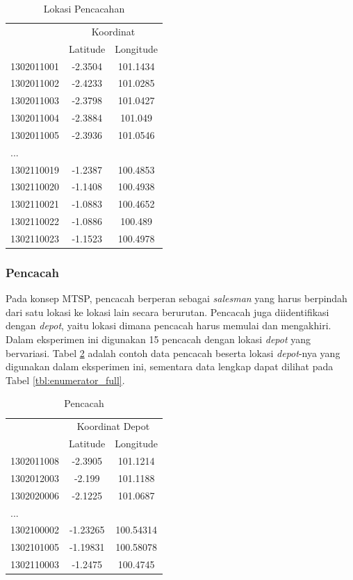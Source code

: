\begin{table}\centering
{}
\caption{Lokasi Pencacahan}
\label{tbl:enumeration_locations}
\begin{tabular}{lcc}
\toprule
& \multicolumn{2}{c}{Koordinat}\\
\cmidrule{2-3}
& Latitude & Longitude\\ 
\midrule
1302011001 & -2.3504 & 101.1434\\ 
1302011002 & -2.4233 & 101.0285\\ 
1302011003 & -2.3798 & 101.0427\\ 
1302011004 & -2.3884 & 101.049\\ 
1302011005 & -2.3936 & 101.0546\\
...\\
1302110019 & -1.2387 & 100.4853\\ 
1302110020 & -1.1408 & 100.4938\\ 
1302110021 & -1.0883 & 100.4652\\ 
1302110022 & -1.0886 & 100.489\\ 
1302110023 & -1.1523 & 100.4978\\
\bottomrule
\end{tabular}
\end{table}


\subsubsection{Pencacah}

Pada konsep MTSP, pencacah berperan sebagai \textit{salesman} yang harus berpindah dari satu lokasi ke lokasi lain secara berurutan. Pencacah juga diidentifikasi dengan \textit{depot}, yaitu lokasi dimana pencacah harus memulai dan mengakhiri. Dalam eksperimen ini digunakan 15 pencacah dengan lokasi \textit{depot} yang bervariasi. Tabel \ref{tbl:enumerator} adalah contoh data pencacah beserta lokasi \textit{depot}-nya yang digunakan dalam eksperimen ini, sementara data lengkap dapat dilihat pada Tabel \ref{tbl:enumerator_full}.


\begin{table}\centering
{}
\caption{Pencacah}
\label{tbl:enumerator}
\begin{tabular}{lcc}
\toprule
& \multicolumn{2}{c}{Koordinat Depot}\\
\cmidrule{2-3}
& Latitude & Longitude\\ 
\midrule
1302011008 & -2.3905 & 101.1214\\
1302012003 & -2.199 & 101.1188\\
1302020006 & -2.1225 & 101.0687\\
...\\
1302100002 & -1.23265 & 100.54314\\
1302101005 & -1.19831 & 100.58078\\
1302110003 & -1.2475 & 100.4745\\
\bottomrule
\end{tabular}
\end{table}


